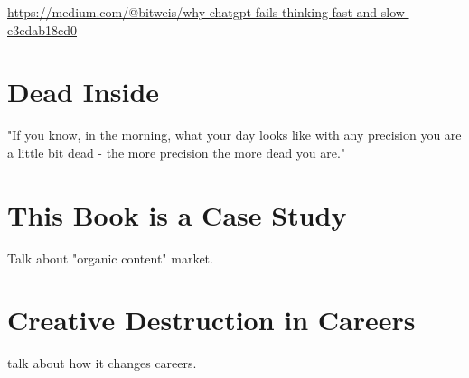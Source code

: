 \url{https://medium.com/@bitweis/why-chatgpt-fails-thinking-fast-and-slow-e3cdab18cd0}

\section{Dead Inside}

"If you know, in the morning, what your day looks like with any precision you are a little bit dead - the more precision the more dead you are."

\section{This Book is a Case Study}

Talk about "organic content" market.

\section{Creative Destruction in Careers}

talk about how it changes careers.
